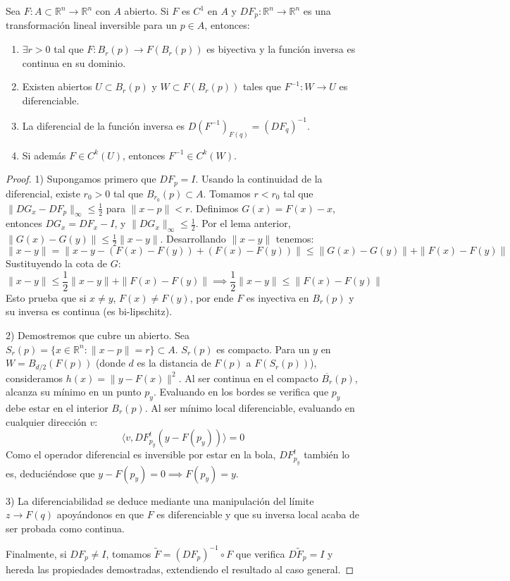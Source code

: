 \begin{theorem}
    Sea \(F: A \subset \mathbb{R}^n \to \mathbb{R}^n\) con \(A\) abierto. Si \(F\) es \(C^1\) en \(A\) y \(DF_p: \mathbb{R}^n \to \mathbb{R}^n\) es una transformación lineal inversible para un \(p \in A\), entonces:
    \begin{enumerate}
        \item \(\exists r > 0\) tal que \(F: B_r(p) \to F(B_r(p))\) es biyectiva y la función inversa es continua en su dominio.
        \item Existen abiertos \(U \subset B_r(p)\) y \(W \subset F(B_r(p))\) tales que \(F^{-1}: W \to U\) es diferenciable.
        \item La diferencial de la función inversa es \(D(F^{-1})_{F(q)} = (DF_q)^{-1}\).
        \item Si además \(F \in C^k(U)\), entonces \(F^{-1} \in C^k(W)\).
    \end{enumerate}
\end{theorem}
\begin{proof}
    1) Supongamos primero que \(DF_p = I\). Usando la continuidad de la diferencial, existe \(r_0 > 0\) tal que \(B_{r_0}(p) \subset A\). Tomamos \(r < r_0\) tal que \(\|DG_x - DF_p\|_\infty \le \frac{1}{2}\) para \(\|x-p\| < r\).
    Definimos \(G(x) = F(x) - x\), entonces \(DG_x = DF_x - I\), y \(\|DG_x\|_\infty \le \frac{1}{2}\). Por el lema anterior, \(\|G(x) - G(y)\| \le \frac{1}{2}\|x-y\|\).
    Desarrollando \(\|x - y\|\) tenemos:
    \[ \|x - y\| = \|x - y - (F(x) - F(y)) + (F(x) - F(y))\| \le \|G(x) - G(y)\| + \|F(x) - F(y)\| \]
    Sustituyendo la cota de \(G\):
    \[ \|x - y\| \le \frac{1}{2}\|x-y\| + \|F(x) - F(y)\| \implies \frac{1}{2}\|x-y\| \le \|F(x) - F(y)\| \]
    Esto prueba que si \(x \neq y\), \(F(x) \neq F(y)\), por ende \(F\) es inyectiva en \(B_r(p)\) y su inversa es continua (es bi-lipschitz).

    2) Demostremos que cubre un abierto. Sea \(S_r(p) = \{x \in \mathbb{R}^n : \|x-p\| = r\} \subset A\). \(S_r(p)\) es compacto. Para un \(y\) en \(W = B_{d/2}(F(p))\) (donde \(d\) es la distancia de \(F(p)\) a \(F(S_r(p))\)), consideramos \(h(x) = \|y - F(x)\|^2\).
    Al ser continua en el compacto \(\overline{B_r}(p)\), alcanza su mínimo en un punto \(p_y\). Evaluando en los bordes se verifica que \(p_y\) debe estar en el interior \(B_r(p)\). Al ser mínimo local diferenciable, evaluando en cualquier dirección \(v\):
    \[ \langle v, DF_{p_y}^t (y - F(p_y)) \rangle = 0 \]
    Como el operador diferencial es inversible por estar en la bola, \(DF_{p_y}^t\) también lo es, deduciéndose que \(y - F(p_y) = 0 \implies F(p_y) = y\).

    3) La diferenciabilidad se deduce mediante una manipulación del límite \(z \to F(q)\) apoyándonos en que \(F\) es diferenciable y que su inversa local acaba de ser probada como continua.

    Finalmente, si \(DF_p \neq I\), tomamos \(\tilde{F} = (DF_p)^{-1} \circ F\) que verifica \(D\tilde{F}_p = I\) y hereda las propiedades demostradas, extendiendo el resultado al caso general.
\end{proof}

